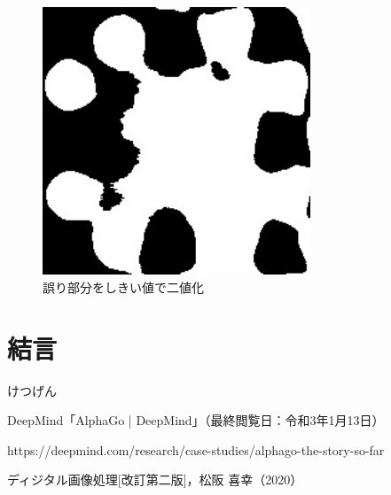 \documentclass[summary]{nitocs}
\numberwithin{equation}{section}
\begin{document}
            \begin{figure}[tb] %
                \begin{center}
                \includegraphics[clip,width=80mm]{DSC_0098/TRIM_inRange_WHITE.jpg} 
                \caption{誤り部分をしきい値で二値化}
                \label{ex3_error_area}
                \end{center}
            \end{figure}



    \section{結言}\label{conclusion}
        けつげん


    \begin{thebibliography}{10}
        DeepMind「AlphaGo | DeepMind」（最終閲覧日：令和3年1月13日）
        
        https://deepmind.com/research/case-studies/alphago-the-story-so-far

        ディジタル画像処理[改訂第二版]，松阪 喜幸（2020）
    \end{thebibliography}
\end{document}
